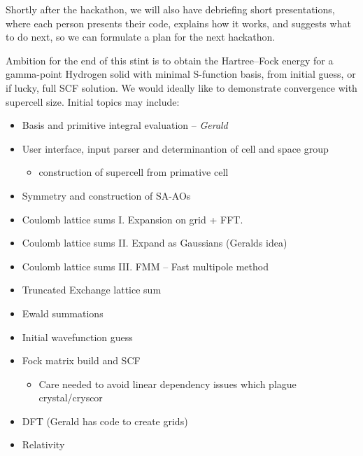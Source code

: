 \documentclass{report}
\begin{document}
Shortly after the hackathon, we will also have debriefing short presentations, where each person presents 
their code, explains how it works, and suggests what to do next, so we can formulate a plan for the next hackathon.

Ambition for the end of this stint is to obtain the Hartree--Fock energy for a gamma-point Hydrogen solid with minimal S-function basis, from initial guess, or if lucky, full SCF solution. 
We would ideally like to demonstrate convergence with supercell size. Initial topics may include:

\begin{itemize}
\item Basis and primitive integral evaluation -- {\em Gerald}

\item User interface, input parser and determinantion of cell and space group
\begin{itemize}
\item construction of supercell from primative cell
\end{itemize}

\item Symmetry and construction of SA-AOs

\item Coulomb lattice sums I. Expansion on grid + FFT.

\item Coulomb lattice sums II. Expand as Gaussians (Geralds idea)

\item Coulomb lattice sums III. FMM -- Fast multipole method

\item Truncated Exchange lattice sum

\item Ewald summations

\item Initial wavefunction guess

\item Fock matrix build and SCF
\begin{itemize}
\item Care needed to avoid linear dependency issues which plague crystal/cryscor
\end{itemize}

\item DFT (Gerald has code to create grids)

\item Relativity

\end{itemize}
\end{document}
